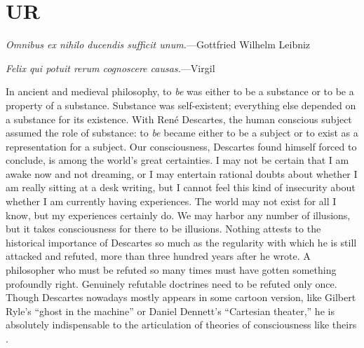 \documentclass[12pt]{article}
\begin{document}
\section{UR}\label{sec.UR}
{\leftskip\parindent\small \emph{Omnibus ex nihilo ducendis sufficit unum.}---Gottfried Wilhelm Leibniz \cite{Leibniz}\par
\smallskip\noindent\emph{Felix qui potuit rerum cognoscere causas.}---Virgil \cite{Virgil} \par}\medskip

\noindent In ancient and medieval philosophy, to \emph{be} was either to be a {substance} or to be a property of a substance. Substance was self-existent; everything else depended on a substance for its existence. With Ren\'e Descartes, the human conscious subject assumed the role of substance: to \emph{be} became either to be a subject or to exist as a representation for a subject. Our consciousness, {Descartes} found himself forced to conclude,  is among the world's great certainties. I may not be certain that I am awake now and not dreaming, or I may entertain rational doubts about whether I am really sitting at a desk writing, but I cannot feel this kind of insecurity about whether I am currently having experiences. The world may not exist for all I know, but my {experience}s certainly do. We may harbor any number of illusions, but it takes consciousness for there to be illusions. Nothing attests to the historical importance of Descartes so much as the regularity with which he is still attacked and refuted, more than three hundred years after he wrote. A philosopher who must be refuted so many times must have gotten something profoundly right. Genuinely refutable doctrines need to be refuted only once. Though Descartes nowadays mostly appears in some cartoon version, like {Gilbert Ryle}'s \cite{Ryle49} ``{ghost in the machine}'' or  {Daniel Dennett}'s \cite{Dennett91} ``{Cartesian theater},'' he is absolutely indispensable to the articulation of theories of consciousness like theirs \cite{Carr99}.
\end{document}
